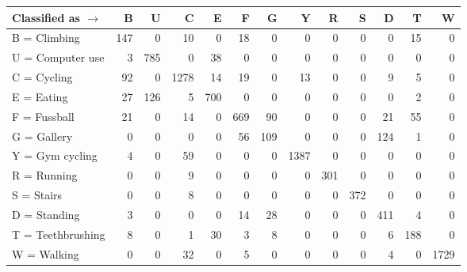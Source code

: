\begin{tabular}{lrrrrrrrrrrrr}
\toprule
Classified as $\rightarrow$ &    B &    U &     C &    E &    F &    G &     Y &    R &    S &    D &    T &     W \\
\midrule
B = Climbing      &  147 &    0 &    10 &    0 &   18 &    0 &     0 &    0 &    0 &    0 &   15 &     0 \\
U = Computer use  &    3 &  785 &     0 &   38 &    0 &    0 &     0 &    0 &    0 &    0 &    0 &     0 \\
C = Cycling       &   92 &    0 &  1278 &   14 &   19 &    0 &    13 &    0 &    0 &    9 &    5 &     0 \\
E = Eating        &   27 &  126 &     5 &  700 &    0 &    0 &     0 &    0 &    0 &    0 &    2 &     0 \\
F = Fussball      &   21 &    0 &    14 &    0 &  669 &   90 &     0 &    0 &    0 &   21 &   55 &     0 \\
G = Gallery       &    0 &    0 &     0 &    0 &   56 &  109 &     0 &    0 &    0 &  124 &    1 &     0 \\
Y = Gym cycling   &    4 &    0 &    59 &    0 &    0 &    0 &  1387 &    0 &    0 &    0 &    0 &     0 \\
R = Running       &    0 &    0 &     9 &    0 &    0 &    0 &     0 &  301 &    0 &    0 &    0 &     0 \\
S = Stairs        &    0 &    0 &     8 &    0 &    0 &    0 &     0 &    0 &  372 &    0 &    0 &     0 \\
D = Standing      &    3 &    0 &     0 &    0 &   14 &   28 &     0 &    0 &    0 &  411 &    4 &     0 \\
T = Teethbrushing &    8 &    0 &     1 &   30 &    3 &    8 &     0 &    0 &    0 &    6 &  188 &     0 \\
W = Walking       &    0 &    0 &    32 &    0 &    5 &    0 &     0 &    0 &    0 &    4 &    0 &  1729 \\
\bottomrule
\end{tabular}
